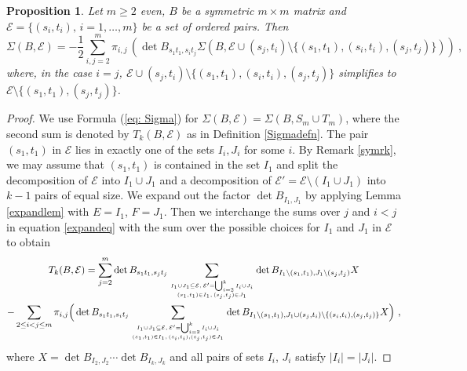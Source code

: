\documentclass[10pt]{amsart}
\newcommand{\sE}{\mathcal{E}}
\theoremstyle{plain}
\newtheorem{prop}[thm]{Proposition}
\newcommand{\0}{\color{blue}{\mathsf{0}}}
\begin{document}
\begin{prop}\label{recprop2}
Let $m\geq2$ even, $B$ be a symmetric $m\times m$ matrix and $\sE=\{(s_i,t_i),\,i=1,\ldots,m\}$ be a set of ordered pairs. Then
\begin{equation}\label{sumdetrec}
\Sigma(B,\sE)=-\frac12\sum_{i,j=2}^m\pi_{i,j} \, \left( \det B_{s_1t_1,s_it_j}\Sigma(B,\sE\cup (s_j,t_i)\setminus  \{(s_1,t_1),(s_i,t_i),(s_j,t_j)\})\right)   \  ,
\end{equation}
where, in the case $i=j$,  $\sE\cup (s_j,t_i)\setminus  \{(s_1,t_1),(s_i,t_i),(s_j,t_j)\}$ simplifies to $\sE \setminus \{(s_1,t_1), (s_j,t_j)\}$.
\end{prop}
\begin{proof}
We use Formula (\ref{eq: Sigma}) for $\Sigma(B,\sE)=\Sigma(B,S_m\cup T_m)$, where the
second sum is denoted by $T_k(B,\sE)$ as in Definition \ref{Sigmadefn}.
The pair $(s_1,t_1)$ in $\sE$ lies in exactly one of the sets $I_i,J_i$ for some $i$. By Remark \ref{symrk}, we may assume that $(s_1,t_1)$ is contained in the set $I_1$ and
split the decomposition of $\sE$ into $I_1\cup J_1$ and a decomposition of $\sE'=\sE\setminus (I_1\cup J_1)$ into $k-1$ pairs of equal size.
We expand out the factor $\det B_{I_1,J_1}$ by applying  Lemma \ref{expandlem} with $E=I_1$, $F=J_1$. Then we interchange the sums over $j$ and $i<j$ in equation \eqref{expandeq} with the
sum over the possible choices for  $I_1$ and $J_1$ in $\sE$ to obtain
\begin{multline} \label{TkBexpression}
T_k(B,\sE)=\sum_{j=2}^m\det B_{s_1t_1,s_jt_j}\sum_{\genfrac{}{}{0pt}{}{I_1\cup J_1\subseteq\sE,\,\sE'=\bigcup_{i=2}^kI_i\cup J_i}{(s_1,t_1)\in I_1,\,(s_j,t_j)\in J_1}}\det B_{I_1\setminus(s_1,t_1),J_1\setminus(s_j,t_j)}X\\
-\sum_{2\leq i<j\leq m}\pi_{i,j}\Big(\det B_{s_1t_1,s_it_j}\sum_{\genfrac{}{}{0pt}{}{I_1\cup J_1\subseteq\sE,\,\sE'=\bigcup_{i=2}^kI_i\cup J_i}{(s_1,t_1)\in I_1,\,(s_i,t_i),(s_j,t_j)\in J_1}}\det B_{I_1\setminus (s_1,t_1),J_1\cup (s_j,t_i)\setminus \{(s_i,t_i),(s_j,t_j)\}}X\Big)\ ,\\
\end{multline}
where $X=\det B_{I_2,J_2}\cdots\det B_{I_k,J_k}$ and all pairs of sets $I_i$, $J_i$  satisfy $|I_i|=|J_i|$.


\end{proof}
\end{document}
